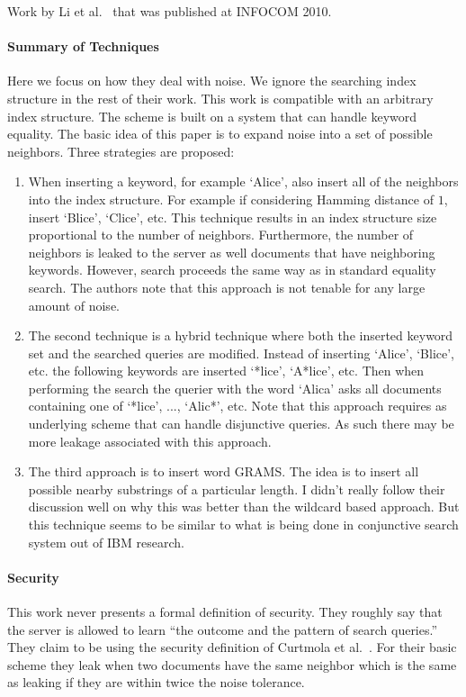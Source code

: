 Work by Li et al.~\cite{li2010fuzzy,wang2013efficient} that was published at INFOCOM 2010.  

\paragraph{Summary of Techniques}  Here we focus on how they deal with noise.  We ignore the searching index structure in the rest of their work.  This work is compatible with an arbitrary index structure.  The scheme is built on a system that can handle keyword equality.  The basic idea of this paper is to expand noise into a set of possible neighbors.  Three strategies are proposed:

\begin{enumerate}
\item When inserting a keyword, for example `Alice', also insert all of the neighbors into the index structure.  For example if considering Hamming distance of $1$, insert `Blice', `Clice', etc.  This technique results in an index structure size proportional to the number of neighbors.  Furthermore, the number of neighbors is leaked to the server as well documents that have neighboring keywords.  However, search proceeds the same way as in standard equality search.  The authors note that this approach is not tenable for any large amount of noise.
\item The second technique is a hybrid technique where both the inserted keyword set and the searched queries are modified.  Instead of inserting `Alice', `Blice', etc. the following keywords are inserted `*lice', `A*lice', etc.  Then when performing the search the querier with the word `Alica' asks all documents containing one of `*lice', ..., `Alic*', etc.  Note that this approach requires as underlying scheme that can handle disjunctive queries.  As such there may be more leakage associated with this approach.
\item The third approach is to insert word GRAMS.  The idea is to insert all possible nearby substrings of a particular length.  I didn't really follow their discussion well on why this was better than the wildcard based approach.  But this technique seems to be similar to what is being done in conjunctive search system out of IBM research.
\end{enumerate}

\paragraph{Security}
This work never presents a formal definition of security.  They roughly say that the server is allowed to learn ``the outcome and the pattern of search queries.''  They claim to be using the security definition of Curtmola et al.~\cite{curtmola2011searchable}.  For their basic scheme they leak when two documents have the same neighbor which is the same as leaking if they are within twice the noise tolerance.  

